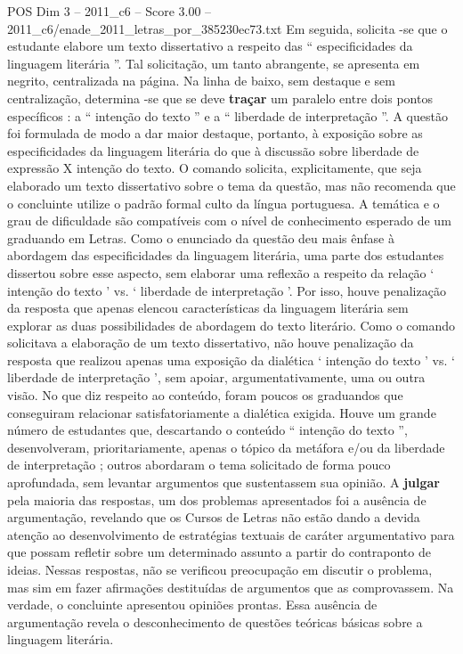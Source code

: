 \begin{textsample}{POS Dim 3 – 2011\_c6 – Score 3.00 – 2011\_c6/enade\_2011\_letras\_por\_385230ec73.txt}
Em seguida, solicita -se que o estudante elabore um texto dissertativo a respeito das “ especificidades da linguagem literária ”.
Tal solicitação, um tanto abrangente, se apresenta em negrito, centralizada na página.
Na linha de baixo, sem destaque e sem centralização, determina -se que se deve \textbf{traçar} um paralelo entre dois pontos específicos : a “ intenção do texto ” e a “ liberdade de interpretação ”.
A questão foi formulada de modo a dar maior destaque, portanto, à exposição sobre as especificidades da linguagem literária do que à discussão sobre liberdade de expressão X intenção do texto.
O comando solicita, explicitamente, que seja elaborado um texto dissertativo sobre o tema da questão, mas não recomenda que o concluinte utilize o padrão formal culto da língua portuguesa.
A temática e o grau de dificuldade são compatíveis com o nível de conhecimento esperado de um graduando em Letras.
Como o enunciado da questão deu mais ênfase à abordagem das especificidades da linguagem literária, uma parte dos estudantes dissertou sobre esse aspecto, sem elaborar uma reflexão a respeito da relação ‘ intenção do texto ’ vs. ‘ liberdade de interpretação ’.
Por isso, houve penalização da resposta que apenas elencou características da linguagem literária sem explorar as duas possibilidades de abordagem do texto literário.
Como o comando solicitava a elaboração de um texto dissertativo, não houve penalização da resposta que realizou apenas uma exposição da dialética ‘ intenção do texto ’ vs. ‘ liberdade de interpretação ’, sem apoiar, argumentativamente, uma ou outra visão.
No que diz respeito ao conteúdo, foram poucos os graduandos que conseguiram relacionar satisfatoriamente a dialética exigida.
Houve um grande número de estudantes que, descartando o conteúdo “ intenção do texto ”, desenvolveram, prioritariamente, apenas o tópico da metáfora e/ou da liberdade de interpretação ; outros abordaram o tema solicitado de forma pouco aprofundada, sem levantar argumentos que sustentassem sua opinião.
A \textbf{julgar} pela maioria das respostas, um dos problemas apresentados foi a ausência de argumentação, revelando que os Cursos de Letras não estão dando a devida atenção ao desenvolvimento de estratégias textuais de caráter argumentativo para que possam refletir sobre um determinado assunto a partir do contraponto de ideias.
Nessas respostas, não se verificou preocupação em discutir o problema, mas sim em fazer afirmações destituídas de argumentos que as comprovassem.
Na verdade, o concluinte apresentou opiniões prontas.
Essa ausência de argumentação revela o desconhecimento de questões teóricas básicas sobre a linguagem literária.

\end{textsample}
